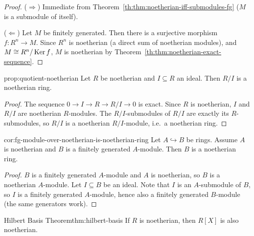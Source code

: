 \begin{proof}
($\Rightarrow$) Immediate from Theorem~\ref{th:thm:noetherian-iff-submodules-fg} ($M$ is a submodule of itself).

($\Leftarrow$) Let $M$ be finitely generated. Then there is a surjective morphism $f: R^n \to M$. Since $R^n$ is noetherian (a direct sum of noetherian modules), and $M \cong R^n/\operatorname{Ker} f$, $M$ is noetherian by Theorem~\ref{th:thm:noetherian-exact-sequence}.
\end{proof}

\begin{proposition}{}{prop:quotient-noetherian}
Let $R$ be noetherian and $I \subseteq R$ an ideal. Then $R/I$ is a noetherian ring.
\end{proposition}

\begin{proof}
The sequence $0 \to I \to R \to R/I \to 0$ is exact. Since $R$ is noetherian, $I$ and $R/I$ are noetherian $R$-modules. The $R/I$-submodules of $R/I$ are exactly its $R$-submodules, so $R/I$ is a noetherian $R/I$-module, i.e.\ a noetherian ring.
\end{proof}

\begin{corollary}{}{cor:fg-module-over-noetherian-is-noetherian-ring}
Let $A \hookrightarrow B$ be rings. Assume $A$ is noetherian and $B$ is a finitely generated $A$-module. Then $B$ is a noetherian ring.
\end{corollary}

\begin{proof}
$B$ is a finitely generated $A$-module and $A$ is noetherian, so $B$ is a noetherian $A$-module. Let $I \subseteq B$ be an ideal. Note that $I$ is an $A$-submodule of $B$, so $I$ is a finitely generated $A$-module, hence also a finitely generated $B$-module (the same generators work).
\end{proof}

\begin{theorem}{Hilbert Basis Theorem}{thm:hilbert-basis}
If $R$ is noetherian, then $R[X]$ is also noetherian.
\end{theorem}

